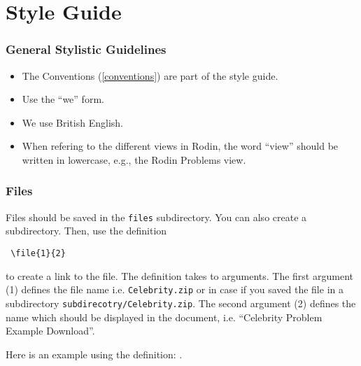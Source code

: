 \section{Style Guide}


\subsubsection{General Stylistic Guidelines}

\begin{itemize}
	\item The Conventions (\ref{conventions}) are part of the style guide.

	\item Use the ``we'' form.

	\item We use British English.

	\item When refering to the different views in Rodin, the word ``view'' should be written in lowercase, e.g., the Rodin Problems view.
\end{itemize}

\subsubsection{Files}

Files should be saved in the \texttt{files} subdirectory. You can also create a subdirectory. Then, use the definition 

\begin{verbatim} \file{1}{2} \end{verbatim} 

to create a link to the file. The definition takes to arguments. The first argument (1) defines the file name i.e. \texttt{Celebrity.zip} or in case if you saved the file in a subdirectory \texttt{subdirecotry/Celebrity.zip}. The second argument (2) defines the name which should be displayed in the document, i.e. ``Celebrity Problem Example Download''.


Here is an example using the definition: .

